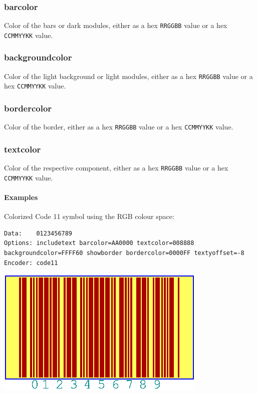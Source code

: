 \hypertarget{barcolor}{%
\subsubsection{barcolor}\label{barcolor}}

Color of the bars or dark modules, either as a hex \texttt{RRGGBB} value
or a hex \texttt{CCMMYYKK} value.

\hypertarget{backgroundcolor}{%
\subsubsection{backgroundcolor}\label{backgroundcolor}}

Color of the light background or light modules, either as a hex
\texttt{RRGGBB} value or a hex \texttt{CCMMYYKK} value.

\hypertarget{bordercolor}{%
\subsubsection{bordercolor}\label{bordercolor}}

Color of the border, either as a hex \texttt{RRGGBB} value or a hex
\texttt{CCMMYYKK} value.

\hypertarget{textcolor}{%
\subsubsection{textcolor}\label{textcolor}}

Color of the respective component, either as a hex \texttt{RRGGBB} value
or a hex \texttt{CCMMYYKK} value.

\hypertarget{examples-52}{%
\paragraph{Examples}\label{examples-52}}

Colorized Code 11 symbol using the RGB colour space:

\begin{verbatim}
Data:    0123456789
Options: includetext barcolor=AA0000 textcolor=008888 backgroundcolor=FFFF60 showborder bordercolor=0000FF textyoffset=-8
Encoder: code11
\end{verbatim}

\includegraphics{images/optcolorrgb.eps}

